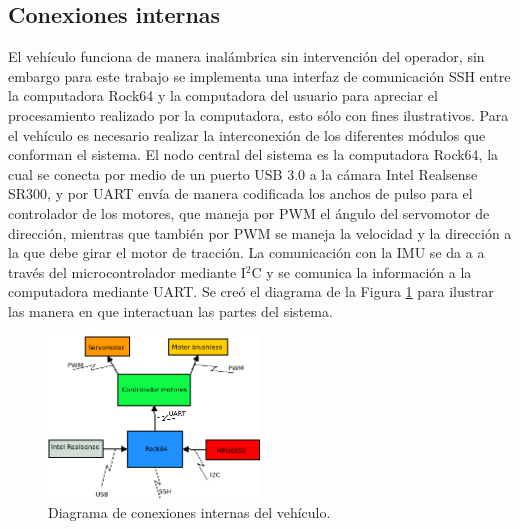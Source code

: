 \subsection{Conexiones internas}
\label{ssec:conint}
El vehículo funciona de manera inalámbrica sin intervención del operador, sin embargo para este trabajo se implementa una interfaz de comunicación SSH entre la computadora Rock64 y la computadora del usuario para apreciar el procesamiento realizado por la computadora, esto sólo con fines ilustrativos. Para el vehículo es necesario realizar la interconexión de los diferentes módulos que conforman el sistema. El nodo central del sistema es la computadora Rock64, la cual se conecta por medio de un puerto USB 3.0 a la cámara Intel Realsense SR300, y por UART envía de manera codificada los anchos de pulso para el controlador de los motores, que maneja por PWM el ángulo del servomotor de dirección, mientras que también por PWM se maneja la velocidad y la dirección a la que debe girar el motor de tracción. La comunicación con la IMU se da a a través del microcontrolador mediante I$^{2}$C y se comunica la información a la computadora mediante UART. Se creó el diagrama de la Figura \ref{fig:conexiones} para ilustrar las manera en que interactuan las partes del sistema.
\begin{figure}[htbp!]
	\centering
	\includegraphics[width=0.5\textwidth]{./Figuras/Conexiones}
	\caption{Diagrama de conexiones internas del vehículo.}
	\label{fig:conexiones}
\end{figure}
